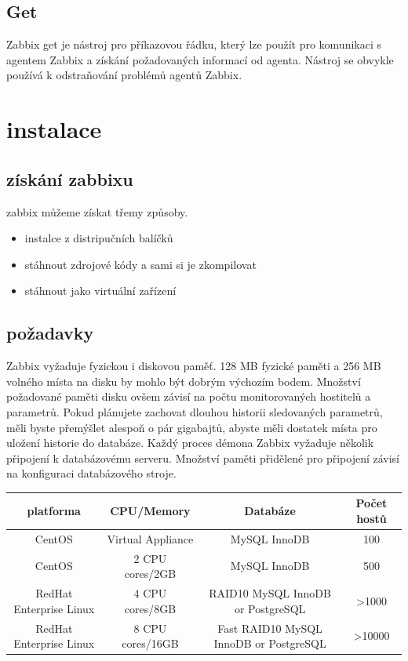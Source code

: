 \documentclass{article}
\begin{document}
\subsection{Get}
Zabbix get je nástroj pro příkazovou řádku, který lze použít pro komunikaci s agentem Zabbix a získání požadovaných informací od agenta.\newline
Nástroj se obvykle používá k odstraňování problémů agentů Zabbix.
\section{instalace}
\subsection{získání zabbixu}
zabbix můžeme získat třemy způsoby.
\begin{itemize}
    \item instalce z distripučních balíčků
    \item stáhnout zdrojové kódy a sami si je zkompilovat
    \item stáhnout jako virtuální zařízení
\end{itemize}
\subsection{požadavky}
   Zabbix vyžaduje fyzickou i diskovou paměť. 128 MB fyzické paměti a 256 MB volného místa na disku by mohlo být dobrým výchozím bodem. Množství požadované paměti disku ovšem závisí na počtu monitorovaných hostitelů a parametrů. Pokud plánujete zachovat dlouhou historii sledovaných parametrů, měli byste přemýšlet alespoň o pár gigabajtů, abyste měli dostatek místa pro uložení historie do databáze. Každý proces démona Zabbix vyžaduje několik připojení k databázovému serveru. Množství paměti přidělené pro připojení závisí na konfiguraci databázového stroje.
\begin{center}
  \begin{tabular}{ | c | c | c | c | }
    \hline
    platforma & CPU/Memory & Databáze & Počet hostů \\ \hline
    CentOS & Virtual Appliance & MySQL InnoDB & 100 \\ \hline
    CentOS & 2 CPU cores/2GB & MySQL InnoDB & 500\\  \hline
    RedHat Enterprise Linux & 4 CPU cores/8GB & RAID10 MySQL InnoDB or PostgreSQL & >1000\\ \hline
    RedHat Enterprise Linux & 8 CPU cores/16GB & Fast RAID10 MySQL InnoDB or PostgreSQL & >10000\\  \hline
  \end{tabular}
\end{center}
\end{document}
